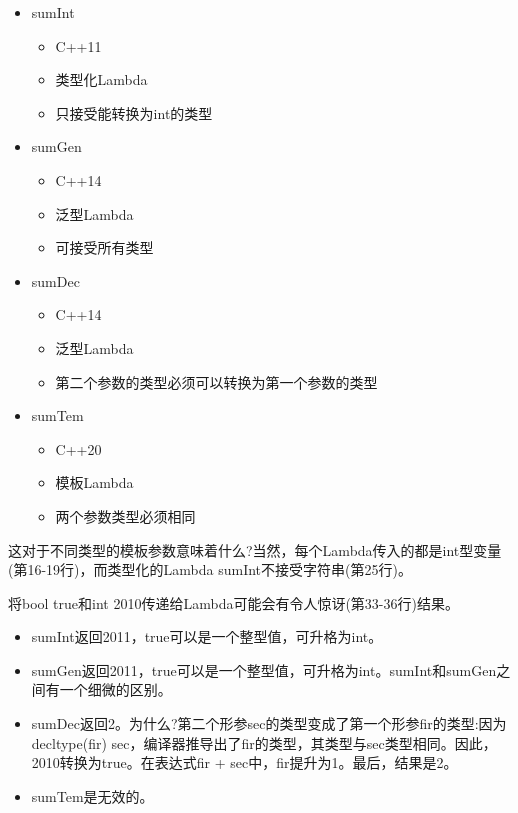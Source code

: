 \begin{itemize}
\item 
sumInt
\begin{itemize}
\item 
C++11

\item 
类型化Lambda

\item 
只接受能转换为int的类型
\end{itemize}

\item 
sumGen
\begin{itemize}
\item 
C++14

\item 
泛型Lambda

\item 
可接受所有类型
\end{itemize}

\item 
sumDec
\begin{itemize}
\item 
C++14

\item 
泛型Lambda

\item 
第二个参数的类型必须可以转换为第一个参数的类型
\end{itemize}

\item 
sumTem
\begin{itemize}
\item 
C++20

\item 
模板Lambda

\item 
两个参数类型必须相同
\end{itemize}
\end{itemize}

这对于不同类型的模板参数意味着什么?当然，每个Lambda传入的都是int型变量(第16-19行)，而类型化的Lambda sumInt不接受字符串(第25行)。

将bool true和int 2010传递给Lambda可能会有令人惊讶(第33-36行)结果。

\begin{itemize}
\item 
sumInt返回2011，true可以是一个整型值，可升格为int。

\item 
sumGen返回2011，true可以是一个整型值，可升格为int。sumInt和sumGen之间有一个细微的区别。

\item 
sumDec返回2。为什么?第二个形参sec的类型变成了第一个形参fir的类型:因为decltype(fir) sec，编译器推导出了fir的类型，其类型与sec类型相同。因此，2010转换为true。在表达式fir + sec中，fir提升为1。最后，结果是2。

\item 
sumTem是无效的。
\end{itemize}

